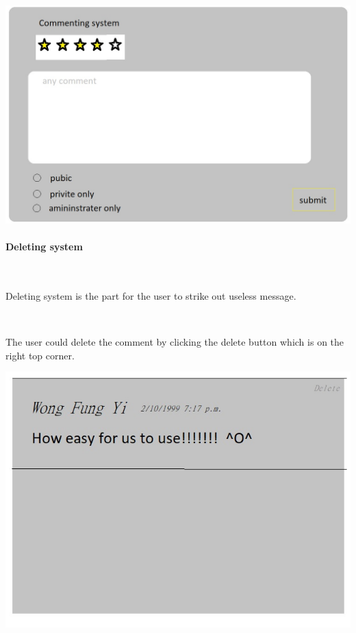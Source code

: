 \includegraphics[scale=0.5]{Doc/Graphics/sdfg}

\paragraph{Deleting system}~

Deleting system is the part for the user to strike out useless message.\par~

The user could delete the comment by clicking the delete button which is on the right top corner.

\includegraphics[scale=0.5]{Doc/Graphics/asdf}

